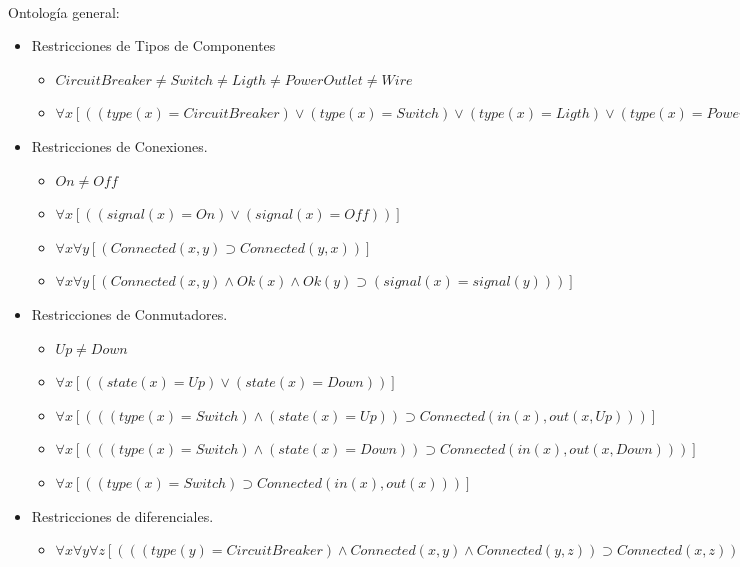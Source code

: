 \documentclass[10pt, a4paper,spanish]{article}
\begin{document}
		\paragraph{}
		Ontología general:
		\begin{itemize}

			\item Restricciones de Tipos de Componentes
			\begin{itemize}
				\item $ CircuitBreaker \neq Switch\neq Ligth \neq PowerOutlet \neq Wire   $
				\item $ \forall x [((type(x) = CircuitBreaker) \lor (type(x) = Switch) \lor (type(x) = Ligth) \lor (type(x) = PowerOutlet) \lor (type(x) = Wire))] $
			\end{itemize}
			\item Restricciones de Conexiones.
			\begin{itemize}
				\item $ On \neq Off $
				\item $ \forall x [((signal(x) = On) \lor (signal(x) = Off))] $
				\item $ \forall x \forall y [(Connected(x, y) \supset Connected(y, x))] $
				\item $ \forall x \forall y [(Connected(x, y) \land Ok(x) \land Ok(y) \supset (signal(x) = signal(y)))] $
			\end{itemize}

			\item Restricciones de Conmutadores.
			\begin{itemize}
				\item $ Up \neq Down $
				\item $ \forall x [( (state(x) = Up) \lor (state(x) = Down))] $
				\item $ \forall x [( ( (type(x) = Switch) \land (state(x) = Up) ) \supset Connected(in(x), out(x, Up)))] $
				\item $ \forall x [( ( (type(x) = Switch) \land (state(x) = Down) ) \supset Connected(in(x), out(x, Down)))] $
				\item $ \forall x [( (type(x) = Switch)  \supset Connected(in(x), out(x)))] $
			\end{itemize}

			\item Restricciones de diferenciales.
			\begin{itemize}
				\item $ \forall x \forall y \forall z [( ((type(y) = CircuitBreaker) \land Connected(x, y) \land Connected(y, z) ) \supset Connected(x, z))] $
			\end{itemize}


\end{itemize}
\end{document}
